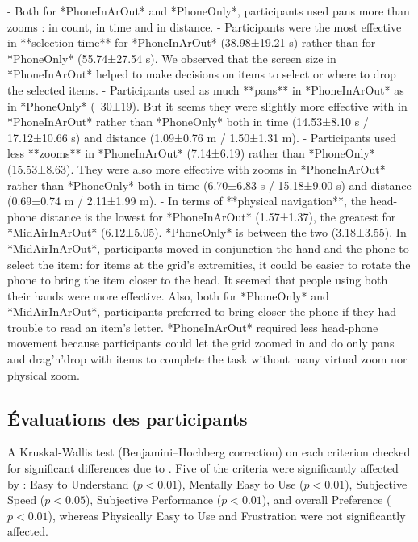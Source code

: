 - Both for *PhoneInArOut* and *PhoneOnly*, participants used pans more than zooms : in count, in time and in distance.
- Participants were the most effective in **selection time** for *PhoneInArOut* (38.98±19.21 s) rather than for *PhoneOnly* (55.74±27.54 s). We observed that the screen size in *PhoneInArOut* helped to make decisions on items to select or where to drop the selected items.
- Participants used as much **pans** in *PhoneInArOut* as in *PhoneOnly* (~30±19). But it seems they were slightly more effective with in *PhoneInArOut* rather than *PhoneOnly* both in time (14.53±8.10 s / 17.12±10.66 s) and distance (1.09±0.76 m / 1.50±1.31 m). 
- Participants used less **zooms** in *PhoneInArOut* (7.14±6.19) rather than *PhoneOnly* (15.53±8.63). They were also more effective with zooms in *PhoneInArOut* rather than *PhoneOnly* both in time (6.70±6.83 s / 15.18±9.00 s) and distance (0.69±0.74 m / 2.11±1.99 m).
- In terms of **physical navigation**, the head-phone distance is the lowest for *PhoneInArOut* (1.57±1.37), the greatest for *MidAirInArOut* (6.12±5.05). *PhoneOnly* is between the two (3.18±3.55). In *MidAirInArOut*, participants moved in conjunction the hand and the phone to select the item: for items at the grid's extremities, it could be easier to rotate the phone to bring the item closer to the head. It seemed that people using both their hands were more effective. Also, both for *PhoneOnly* and *MidAirInArOut*, participants preferred to bring closer the phone if they had trouble to read an item's letter. *PhoneInArOut* required less head-phone movement because participants could let the grid zoomed in and do only pans and drag'n'drop with items to complete the task without many virtual zoom nor physical zoom.


\subsection{Évaluations des participants}
\label{subsec:experiment_results_evaluations}

A Kruskal-Wallis test (Benjamini–Hochberg correction) on each criterion checked for significant differences due to . Five of the criteria were significantly affected by : Easy to Understand ($p<0.01$), Mentally Easy to Use ($p<0.01$), Subjective Speed ($p<0.05$), Subjective Performance ($p<0.01$), and overall Preference ($p<0.01$), whereas Physically Easy to Use and Frustration were not significantly affected.

